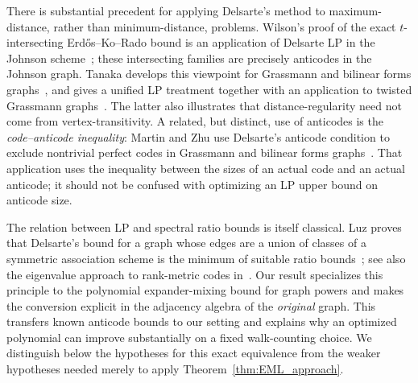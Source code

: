 \documentclass[10pt,a4paper]{article}
\theoremstyle{plain}
\numberwithin{equation}{section}
\begin{document}
There is substantial precedent for applying Delsarte's method to maximum-distance, rather than minimum-distance, problems. Wilson's proof of the exact $t$-intersecting Erd\H{o}s--Ko--Rado bound is an application of Delsarte LP in the Johnson scheme~\cite{Wilson_1984}; these intersecting families are precisely anticodes in the Johnson graph. Tanaka develops this viewpoint for Grassmann and bilinear forms graphs~\cite{Tanaka_2006}, and gives a unified LP treatment together with an application to twisted Grassmann graphs~\cite{Tanaka_2012}. The latter also illustrates that distance-regularity need not come from vertex-transitivity. A related, but distinct, use of anticodes is the \emph{code--anticode inequality}: Martin and Zhu use Delsarte's anticode condition to exclude nontrivial perfect codes in Grassmann and bilinear forms graphs~\cite{Martin_Zhu_1995}. That application uses the inequality between the sizes of an actual code and an actual anticode; it should not be confused with optimizing an LP upper bound on anticode size.

The relation between LP and spectral ratio bounds is itself classical. Luz proves that Delsarte's bound for a graph whose edges are a union of classes of a symmetric association scheme is the minimum of suitable ratio bounds~\cite{Luz_2007}; see also the eigenvalue approach to rank-metric codes in~\cite{Abiad2024EigenvalueCodes}. Our result specializes this principle to the polynomial expander-mixing bound for graph powers and makes the conversion explicit in the adjacency algebra of the \emph{original} graph. This transfers known anticode bounds to our setting and explains why an optimized polynomial can improve substantially on a fixed walk-counting choice. We distinguish below the hypotheses for this exact equivalence from the weaker hypotheses needed merely to apply Theorem~\ref{thm:EML_approach}.


\end{document}
